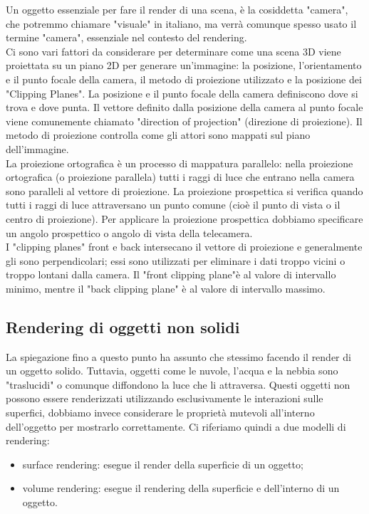 Un oggetto essenziale per fare il render di una scena, è la cosiddetta "camera", che potremmo chiamare "visuale" in italiano, ma verrà comunque spesso usato il termine "camera", essenziale nel contesto del rendering.\\
Ci sono vari fattori da considerare per determinare come una scena 3D viene proiettata su un piano 2D per generare un'immagine: la posizione, l'orientamento e il punto focale della camera, il metodo di proiezione utilizzato e la posizione dei "Clipping Planes". La posizione e il punto focale della camera definiscono dove si trova e dove punta. Il vettore definito dalla posizione della camera al punto focale viene comunemente chiamato "direction of projection" (direzione di proiezione). Il metodo di proiezione controlla come gli attori sono mappati sul piano dell'immagine.
\\
La proiezione ortografica è un processo di mappatura parallelo: nella proiezione ortografica (o proiezione parallela) tutti i raggi di luce che entrano nella camera sono paralleli al vettore di proiezione. La proiezione prospettica si verifica quando tutti i raggi di luce attraversano un punto comune (cioè il punto di vista o il centro di proiezione). Per applicare la proiezione prospettica dobbiamo specificare un angolo prospettico o angolo di vista della telecamera.
\\
I "clipping planes" front e back intersecano il vettore di proiezione e generalmente gli sono perpendicolari; essi sono utilizzati per eliminare i dati troppo vicini o troppo lontani dalla camera. Il "front clipping plane"è al valore di intervallo minimo, mentre il "back clipping plane" è al valore di intervallo massimo.

\subsection{Rendering di oggetti non solidi}
La spiegazione fino a questo punto ha assunto che stessimo facendo il render di un oggetto solido. Tuttavia, oggetti come le nuvole, l'acqua e la nebbia sono "traslucidi" o comunque diffondono la luce che li attraversa. Questi oggetti non possono essere renderizzati utilizzando esclusivamente le interazioni sulle superfici, dobbiamo invece considerare le proprietà mutevoli all'interno dell'oggetto per mostrarlo correttamente. Ci riferiamo quindi a due modelli di rendering:
\begin{itemize}
\item surface rendering: esegue il render della superficie di un oggetto;
\item volume rendering: esegue il rendering della superficie e dell'interno di un oggetto.
\end{itemize}

